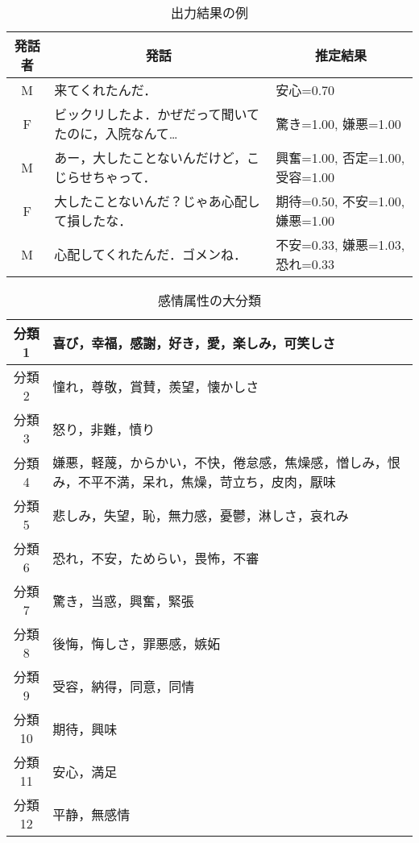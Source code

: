 \documentclass[japanese]{jnlp_1.3c}
\begin{document}
\begin{table}[t]
\begin{center}
\caption{出力結果の例}
\begin{tabular}{|c|p{4.5cm}|l|}
\hline
\multicolumn{1}{|c|}{発話者}	&	\multicolumn{1}{|c|}{発話}	&	\multicolumn{1}{|c|}{推定結果}	\\ \hline \hline
M	&	来てくれたんだ．	&	安心=0.70	\\ \hline
F	&	ビックリしたよ．かぜだって聞いてたのに，入院なんて…	&	驚き=1.00, 嫌悪=1.00	\\ \hline 
M	&	あー，大したことないんだけど，こじらせちゃって．		&	興奮=1.00, 否定=1.00, 受容=1.00	\\ \hline
F	&	大したことないんだ？じゃあ心配して損したな．	&	期待=0.50, 不安=1.00, 嫌悪=1.00		\\ \hline
M	&	心配してくれたんだ．ゴメンね．&	不安=0.33, 嫌悪=1.03, 恐れ=0.33	\\ \hline
\end{tabular}
\label{tb:sample}
\end{center}
\end{table}
\begin{table}[t]
\begin{center}
\caption{感情属性の大分類}
\begin{tabular}{|c||p{9cm}|}
\hline 
分類1	&	喜び，幸福，感謝，好き，愛，楽しみ，可笑しさ \\ \hline
分類2	&	憧れ，尊敬，賞賛，羨望，懐かしさ \\ \hline
分類3	&	怒り，非難，憤り \\ \hline
分類4	&	嫌悪，軽蔑，からかい，不快，倦怠感，焦燥感，憎しみ，恨み，不平不満，呆れ，焦燥，苛立ち，皮肉，厭味 \\ \hline
分類5	&	悲しみ，失望，恥，無力感，憂鬱，淋しさ，哀れみ \\ \hline
分類6	&	恐れ，不安，ためらい，畏怖，不審 \\ \hline
分類7	&	驚き，当惑，興奮，緊張 \\ \hline
分類8	&	後悔，悔しさ，罪悪感，嫉妬 \\ \hline
分類9	&	受容，納得，同意，同情 \\ \hline
分類10	&	期待，興味 \\ \hline
分類11  &	安心，満足 \\ \hline
分類12  &	平静，無感情 \\ \hline
\end{tabular}
\label{tb:lclass}
\end{center}
\end{table}
\end{document}
